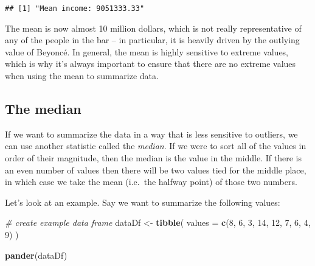 \documentclass[]{book}
\newenvironment{Shaded}{\begin{snugshade}}{\end{snugshade}}
\newcommand{\KeywordTok}[1]{\textcolor[rgb]{0.13,0.29,0.53}{\textbf{#1}}}
\newcommand{\DataTypeTok}[1]{\textcolor[rgb]{0.13,0.29,0.53}{#1}}
\newcommand{\DecValTok}[1]{\textcolor[rgb]{0.00,0.00,0.81}{#1}}
\newcommand{\StringTok}[1]{\textcolor[rgb]{0.31,0.60,0.02}{#1}}
\newcommand{\CommentTok}[1]{\textcolor[rgb]{0.56,0.35,0.01}{\textit{#1}}}
\newcommand{\NormalTok}[1]{#1}
\theoremstyle{definition}
\theoremstyle{definition}
\theoremstyle{definition}
\theoremstyle{remark}
\begin{document}
\begin{verbatim}
## [1] "Mean income: 9051333.33"
\end{verbatim}

The mean is now almost 10 million dollars, which is not really
representative of any of the people in the bar -- in particular, it is
heavily driven by the outlying value of Beyoncé. In general, the mean is
highly sensitive to extreme values, which is why it's always important
to ensure that there are no extreme values when using the mean to
summarize data.

\subsection{The median}\label{the-median}

If we want to summarize the data in a way that is less sensitive to
outliers, we can use another statistic called the \emph{median}. If we
were to sort all of the values in order of their magnitude, then the
median is the value in the middle. If there is an even number of values
then there will be two values tied for the middle place, in which case
we take the mean (i.e.~the halfway point) of those two numbers.

Let's look at an example. Say we want to summarize the following values:

\begin{Shaded}
\begin{Highlighting}[]
\CommentTok{# create example data frame}
\NormalTok{dataDf <-}\StringTok{ }
\StringTok{  }\KeywordTok{tibble}\NormalTok{(}
    \DataTypeTok{values =} \KeywordTok{c}\NormalTok{(}\DecValTok{8}\NormalTok{, }\DecValTok{6}\NormalTok{, }\DecValTok{3}\NormalTok{, }\DecValTok{14}\NormalTok{, }\DecValTok{12}\NormalTok{, }\DecValTok{7}\NormalTok{, }\DecValTok{6}\NormalTok{, }\DecValTok{4}\NormalTok{, }\DecValTok{9}\NormalTok{)}
\NormalTok{  )}

\KeywordTok{pander}\NormalTok{(dataDf)}
\end{Highlighting}
\end{Shaded}
\end{document}
